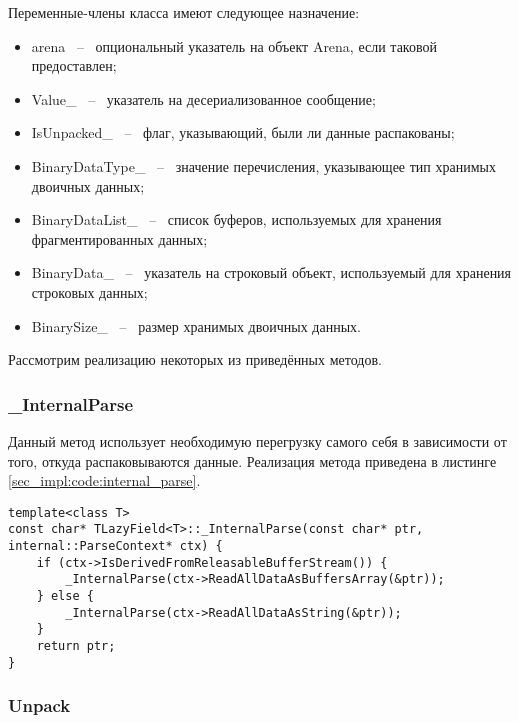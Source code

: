 Переменные-члены класса имеют следующее назначение:

\begin{itemize}
    \item arena ~--~ опциональный указатель на объект Arena, если таковой предоставлен;
    \item Value\_ ~--~ указатель на десериализованное сообщение;
    \item IsUnpacked\_ ~--~ флаг, указывающий, были ли данные распакованы;
    \item BinaryDataType\_ ~--~ значение перечисления, указывающее тип хранимых двоичных данных;
    \item BinaryDataList\_ ~--~ список буферов, используемых для хранения фрагментированных данных;
    \item BinaryData\_ ~--~ указатель на строковый объект, используемый для хранения строковых данных;
    \item BinarySize\_ ~--~ размер хранимых двоичных данных.
\end{itemize}

Рассмотрим реализацию некоторых из приведённых методов. 

\subsubsection{\_InternalParse}

Данный метод использует необходимую перегрузку самого себя в зависимости от того, откуда распаковываются данные.
Реализация метода приведена в листинге \ref{sec_impl:code:internal_parse}.

\noindent\begin{minipage}{\linewidth}
\begin{lstlisting}[style=CodeListing, label=sec_impl:code:internal_parse, caption={Реализация метода \_InternalParse}]
template<class T>
const char* TLazyField<T>::_InternalParse(const char* ptr, internal::ParseContext* ctx) {
    if (ctx->IsDerivedFromReleasableBufferStream()) {
        _InternalParse(ctx->ReadAllDataAsBuffersArray(&ptr));
    } else {
        _InternalParse(ctx->ReadAllDataAsString(&ptr));
    }
    return ptr;
}
\end{lstlisting}
\end{minipage}
\vspace{-1em}
\subsubsection{Unpack}

